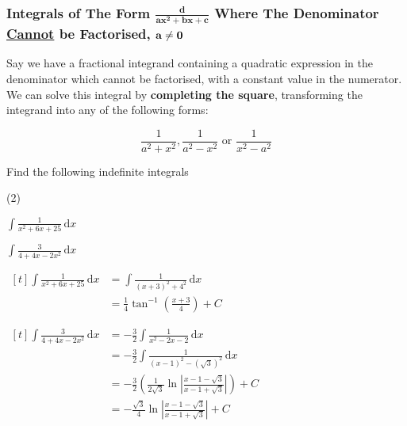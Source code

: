 \documentclass[11pt,a4paper]{book}
\begin{document}
\subsubsection{Integrals of The Form $\boldsymbol{\frac{d}{ax^{2}+bx+c}}$ Where
The Denominator \uline{Cannot} be Factorised, $\ensuremath{\mathbf{a\protect\neq0}}$}

Say we have a fractional integrand containing a quadratic expression
in the denominator which cannot be factorised, with a constant value
in the numerator. We can solve this integral by \textbf{completing
the square}, transforming the integrand into any of the following
forms:

\[
\frac{1}{a^{2}+x^{2}},\frac{1}{a^{2}-x^{2}}\text{ or }\frac{1}{x^{2}-a^{2}}
\]

\begin{example}

Find the following indefinite integrals

\begin{tasks}[label=(\alph*),label-width=3.5ex](2)

\task  ${\displaystyle \int\frac{1}{x^{2}+6x+25}\, \mathrm{d}x}$

\task  ${\displaystyle \int\frac{3}{4+4x-2x^{2}}\, \mathrm{d}x}$

\end{tasks}

\Solution

\begin{tasks}[label=(\alph*),label-width=3.5ex,after-item-skip = 1cm]

\task
$
\begin{aligned}[t]
{\displaystyle \int\frac{1}{x^{2}+6x+25}\, \mathrm{d}x} & ={\displaystyle \int\frac{1}{(x+3)^{2}+4^{2}}\, \mathrm{d}x}\\
 & =\frac{1}{4}\tan^{-1}\left(\frac{x+3}{4}\right)+C
\end{aligned}
$

\task
$
\begin{aligned}[t]
\int\frac{3}{4+4x-2x^{2}}\, \mathrm{d}x & =-\frac{3}{2}\int\frac{1}{x^{2}-2x-2}\, \mathrm{d}x\\
 & =-\frac{3}{2}\int\frac{1}{(x-1)^{2}-\left(\sqrt{3}\right)^{2}}\, \mathrm{d}x\\
 & =-\frac{3}{2}\left(\frac{1}{2\sqrt{3}}\ln\left|\frac{x-1-\sqrt{3}}{x-1+\sqrt{3}}\right|\right)+C\\
 & =-\frac{\sqrt{3}}{4}\ln\left|\frac{x-1-\sqrt{3}}{x-1+\sqrt{3}}\right|+C
\end{aligned}
$

\end{tasks}

\end{example}
\end{document}
